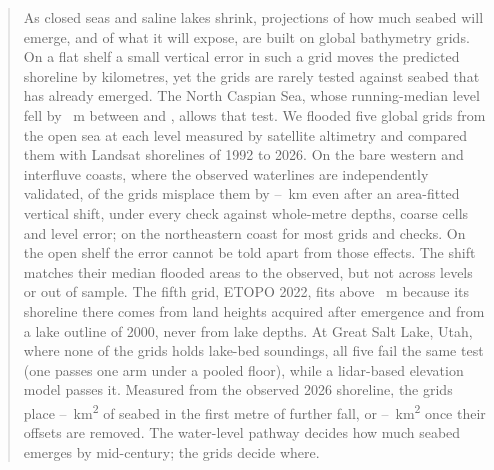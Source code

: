 \begin{abstract}
\noindent As closed seas and saline lakes shrink, projections of how much seabed will emerge, and of what it will expose, are built on global bathymetry grids. On a flat shelf a small vertical error in such a grid moves the predicted shoreline by kilometres, yet the grids are rarely tested against seabed that has already emerged. The North Caspian Sea, whose running-median level fell by ~m between  and , allows that test. We flooded five global grids from the open sea at each level measured by satellite altimetry and compared them with Landsat shorelines of 1992 to 2026. On the bare western and interfluve coasts, where the observed waterlines are independently validated,  of the grids misplace them by --~km even after an area-fitted vertical shift, under every check against whole-metre depths, coarse cells and level error; on the northeastern coast for most grids and checks. On the open shelf the error cannot be told apart from those effects. The shift matches their median flooded areas to the observed, but not across levels or out of sample. The fifth grid, ETOPO 2022, fits above ~m because its shoreline there comes from land heights acquired after emergence and from a lake outline of 2000, never from lake depths. At Great Salt Lake, Utah, where none of the grids holds lake-bed soundings, all five fail the same test (one passes one arm under a pooled floor), while a lidar-based elevation model passes it. Measured from the observed 2026 shoreline, the grids place --~km\textsuperscript{2} of seabed in the first metre of further fall, or --~km\textsuperscript{2} once their offsets are removed. The water-level pathway decides how much seabed emerges by mid-century; the grids decide where.
\end{abstract}
